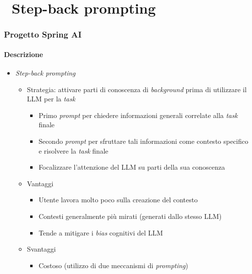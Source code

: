 \section{\faWrench\ Step-back prompting} %
\label{sec:spring-ai-gemini-step-back-prompting}
%
\begin{frame}[t,fragile] \frametitle{Progetto Spring AI}
    \framesubtitle{Descrizione}
    {\small
        \begin{itemize}[leftmargin=10pt,align=right]
            \item[\alertedcircled{1}] \textit{Step-back prompting}
            \begin{itemize}[leftmargin=10pt,align=right]
                \item[\alert{\faArrowCircleRight}] Strategia: attivare parti di conoscenza di \textit{background} prima di utilizzare il LLM per la \textit{task}
                \begin{itemize}[leftmargin=10pt,align=right]
                    \item[\alert{\faArrowCircleRight}] Primo \textit{prompt} per chiedere informazioni generali correlate alla \textit{task} finale
                    \item[\alert{\faArrowCircleRight}] Secondo \textit{prompt} per sfruttare tali informazioni come contesto specifico e risolvere la \textit{task} finale
                    \item[\alert{\faExclamationTriangle}] Focalizzare l'attenzione del LLM su \alert{parti della sua conoscenza} 
                \end{itemize}
                \item[\alert{\faArrowCircleRight}] Vantaggi
                \begin{itemize}[leftmargin=10pt,align=right]
                    \item[\alert{\faArrowCircleRight}] Utente lavora molto poco sulla creazione del contesto
                    \item[\alert{\faArrowCircleRight}] Contesti generalmente più mirati (generati dallo stesso LLM)
                    \item[\alert{\faArrowCircleRight}] Tende a mitigare i \textit{bias} cognitivi del LLM
                \end{itemize}
                \item[\alert{\faArrowCircleRight}] Svantaggi
                \begin{itemize}[leftmargin=10pt,align=right]
                    \item[\alert{\faArrowCircleRight}] Costoso (utilizzo di due meccanismi di \textit{prompting})
                \end{itemize}               
            \end{itemize}
        \end{itemize}
    }
\end{frame}
